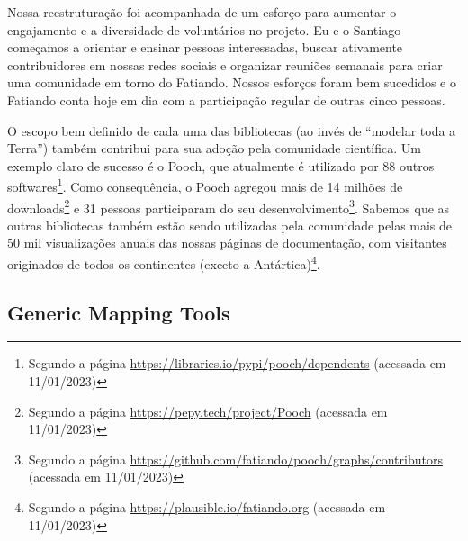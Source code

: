 \documentclass[12pt,a4paper,oneside]{book}
\begin{document}
Nossa reestruturação foi acompanhada de um esforço para aumentar o engajamento
e a diversidade de voluntários no projeto.
Eu e o Santiago começamos a orientar e ensinar pessoas interessadas, buscar
ativamente contribuidores em nossas redes sociais e organizar reuniões semanais
para criar uma comunidade em torno do Fatiando.
Nossos esforços foram bem sucedidos e o Fatiando conta hoje em dia com a
participação regular de outras cinco pessoas.

O escopo bem definido de cada uma das bibliotecas (ao invés de ``modelar
toda a Terra'') também contribui para sua adoção pela comunidade científica.
Um exemplo claro de sucesso é o Pooch, que atualmente é utilizado por 88 outros
softwares\footnote{Segundo a página
\url{https://libraries.io/pypi/pooch/dependents} (acessada em 11/01/2023)}.
Como consequência, o Pooch agregou mais de 14 milhões de downloads\footnote{Segundo a página
\url{https://pepy.tech/project/Pooch} (acessada em 11/01/2023)} e 31 pessoas
participaram do seu desenvolvimento\footnote{Segundo a página
\url{https://github.com/fatiando/pooch/graphs/contributors} (acessada em
11/01/2023)}.
Sabemos que as outras bibliotecas também estão sendo utilizadas pela comunidade
pelas mais de 50 mil visualizações anuais das nossas páginas de documentação,
com visitantes originados de todos os continentes (exceto a Antártica)\footnote{Segundo a página
\url{https://plausible.io/fatiando.org} (acessada em 11/01/2023)}.



\subsection{Generic Mapping Tools}
\label{sec_gmt}
\end{document}
